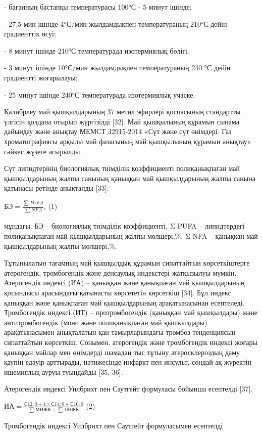 - бағанның бастапқы температурасы 100°С - 5 минут ішінде;

- 27,5 мин ішінде 4°С/мин жылдамдықпен температураның 210°С дейін
градиенттік өсуі;

- 8 минут ішінде 210°С температурада изотермиялық бөлігі.

- 3 минут ішінде 10°С/мин жылдамдықпен температураның 240 °С дейін
градиентті жоғарылауы;

- 25 минут ішінде 240°С температурада изотермиялық учаске.

Калибрлеу май қышқылдарының 37 метил эфирлері қоспасының стандартты
үлгісін қолдана отырып жүргізілді {[}32{]}. Май қышқылының құрамын
сынама дайындау және анықтау МЕМСТ 32915-2014 «Сүт және сүт өнімдері.
Газ хроматографиясы арқылы май фазасының май қышқылының құрамын анықтау»
сәйкес жүзеге асырылды.

Сүт липидтерінің биологиялық тиімділік коэффициенті полиқанықпаған май
қышқылдарының жалпы санының қаныққан май қышқылдарының жалпы санына
қатынасы ретінде анықталды {[}33{]}:

\(БЭ = \frac{\sum_{}^{}{PUFA}}{\sum_{}^{}{NFA}}\), (1)

мұндағы: БЭ -- биологиялық тиімділік коэффициенті, Σ PUFA --
липидтердегі полиқанықпаған май қышқылдарының жалпы мөлшері,\%, Σ NFA --
қаныққан май қышқылдарының жалпы мөлшері,\%.

Тұтынылатын тағамның май қышқылдық құрамын сипаттайтын көрсеткіштерге
атерогендік, тромбогендік және денсаулық индекстері жатқызылуы мүмкін.
Атерогендік индексі (ИА) -- қаныққан және қанықпаған май қышқылдарының
қосындысы арасындағы қатынасты көрсететін көрсеткіш {[}34{]}. Бұл индекс
қаныққан және қанықпаған май қышқылдарының арақатынасынан есептеледі.
Тромбогендік индексі (ИТ) -- протромбогендік (қаныққан май қышқылдары)
және антитромбогендік (моно және полиқанықпаған май қышқылдары)
арақатынасымен анықталатын қан тамырларындағы тромбоз тенденциясын
сипаттайтын көрсеткіш. Сонымен, атерогендік және тромбогендік индексі
жоғары қаныққан майлар мен өнімдерді шамадан тыс тұтыну атеросклероздың
даму қаупін едәуір арттырады, нәтижесінде инфаркт пен инсульт, сондай-ақ
жүректің ишемиялық ауруы туындайды {[}35, 36{]}.

Атерогендік индексі Уилбрихт пен Саутгейт формуласы бойынша есептелді
{[}37{]}.

\(ИА = \frac{С12:0 + 4 \times С14:0 + С16:0}{\sum_{}^{}{МНЖК + \sum_{}^{}{ПНЖК}}}\)
(2)

Тромбогендік индексі Уилбрихт пен Саутгейт формуласымен есептелді

